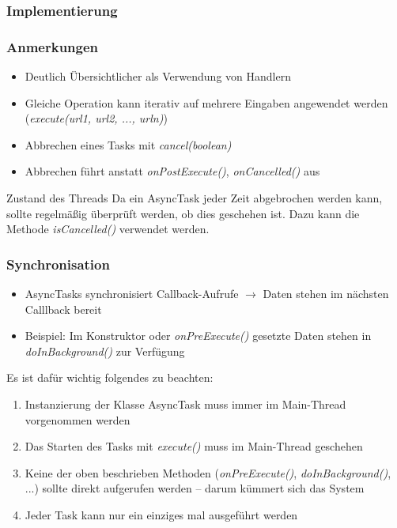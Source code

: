 \begin{frame}
   \frametitle{Implementierung}
	
\end{frame}

\begin{frame}
   \frametitle{Anmerkungen}
   \begin{itemize}
     	\item Deutlich Übersichtlicher als Verwendung von Handlern
     	\item Gleiche Operation kann iterativ auf mehrere 
			Eingaben angewendet werden (\emph{execute(url1, url2, ..., urln)})
     	\item Abbrechen eines Tasks mit \emph{cancel(boolean)}
     	\item Abbrechen führt anstatt \emph{onPostExecute()}, \emph{onCancelled()} 
     		aus
   \end{itemize}
   
   \begin{alertblock}{Zustand des Threads}
   	Da ein AsyncTask jeder Zeit abgebrochen werden kann, sollte regelmäßig 
   	überprüft werden, ob dies geschehen ist. Dazu kann die Methode 
   	\emph{isCancelled()} verwendet werden.
   \end{alertblock}
\end{frame}

\begin{frame}
   \frametitle{Synchronisation}
   \begin{itemize}
     	\item AsyncTasks synchronisiert Callback-Aufrufe
     		$\rightarrow$ Daten stehen im nächsten Calllback bereit
     	\item Beispiel: Im Konstruktor oder \emph{onPreExecute()} gesetzte Daten 
     		stehen in \emph{doInBackground()} zur Verfügung 
   \end{itemize}

	Es ist dafür wichtig folgendes zu beachten:

	\begin{enumerate}
		\item Instanzierung der Klasse AsyncTask muss immer im Main-Thread vorgenommen werden
		\item Das Starten des Tasks mit \emph{execute()} muss im Main-Thread geschehen
		\item Keine der oben beschrieben Methoden (\emph{onPreExecute()}, \emph{doInBackground()}, ...) 
			sollte direkt aufgerufen werden -- darum kümmert sich das System
		\item Jeder Task kann nur ein einziges mal ausgeführt werden
	\end{enumerate}
\end{frame}

